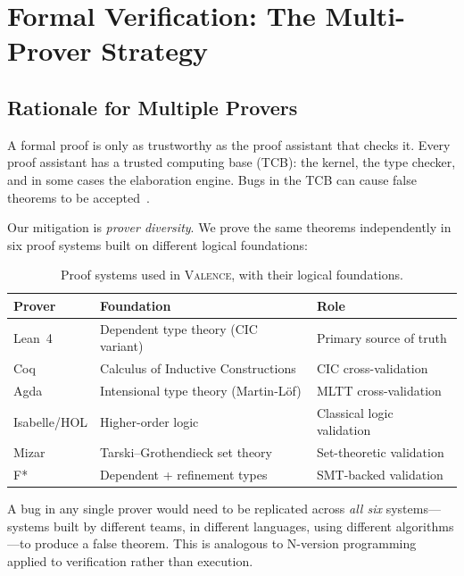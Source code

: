 \documentclass[11pt,a4paper]{article}
\newcommand{\valence}{\textsc{Valence}}
\begin{document}
\section{Formal Verification: The Multi-Prover Strategy}
\label{sec:verification}

\subsection{Rationale for Multiple Provers}

A formal proof is only as trustworthy as the proof assistant that checks it.
Every proof assistant has a trusted computing base (TCB): the kernel, the type
checker, and in some cases the elaboration engine. Bugs in the TCB can cause
false theorems to be accepted~\citep{pollack1998}.

Our mitigation is \emph{prover diversity}. We prove the same theorems
independently in six proof systems built on different logical foundations:

\begin{table}[t]
\centering
\caption{Proof systems used in \valence{}, with their logical foundations.}
\label{tab:provers}
\begin{tabular}{@{}lll@{}}
\toprule
\textbf{Prover} & \textbf{Foundation} & \textbf{Role} \\
\midrule
Lean~4              & Dependent type theory (CIC variant) & Primary source of truth \\
Coq                 & Calculus of Inductive Constructions & CIC cross-validation \\
Agda                & Intensional type theory (Martin-L\"of) & MLTT cross-validation \\
Isabelle/HOL        & Higher-order logic & Classical logic validation \\
Mizar               & Tarski--Grothendieck set theory & Set-theoretic validation \\
F*                  & Dependent + refinement types & SMT-backed validation \\
\bottomrule
\end{tabular}
\end{table}

A bug in any single prover would need to be replicated across \emph{all six}
systems---systems built by different teams, in different languages, using
different algorithms---to produce a false theorem. This is analogous to
N-version programming~\citep{avizienis1985} applied to verification rather
than execution.
\end{document}
